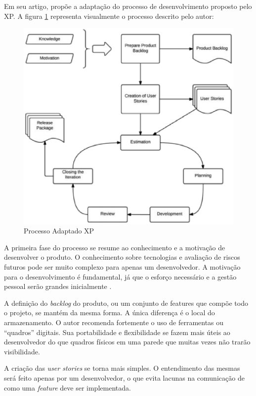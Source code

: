 Em seu artigo, \cite{Bernabe:2015} propõe a adaptação do processo de desenvolvimento proposto pelo XP. A figura \ref{fig04} representa visualmente o processo descrito pelo autor:

\begin{figure}[h]
	\centering
	\includegraphics[keepaspectratio=true,scale=0.6]{figuras/fig04.eps}
	\caption{Processo Adaptado XP \cite{Bernabe:2015}}
	\label{fig04}
\end{figure}

A primeira fase do processo se resume ao conhecimento e a motivação de desenvolver o produto. O conhecimento sobre tecnologias e avaliação de riscos futuros pode ser muito complexo para apenas um desenvolvedor. A motivação para o desenvolvimento é fundamental, já que o esforço necessário e a gestão pessoal serão grandes inicialmente \cite{Bernabe:2015}.

A definição do \textit{backlog} do produto, ou um conjunto de features que compõe todo o projeto, se mantém da mesma forma.  A única diferença é o local do armazenamento. O autor recomenda fortemente o uso de ferramentas ou “quadros” digitais. Sua portabilidade e flexibilidade se fazem mais úteis ao desenvolvedor do que quadros físicos em uma parede que muitas vezes não trarão visibilidade.

A criação das \textit{user stories} se torna mais simples. O entendimento das mesmas será feito apenas por um desenvolvedor, o que evita lacunas na comunicação de como uma \textit{feature} deve ser implementada.

